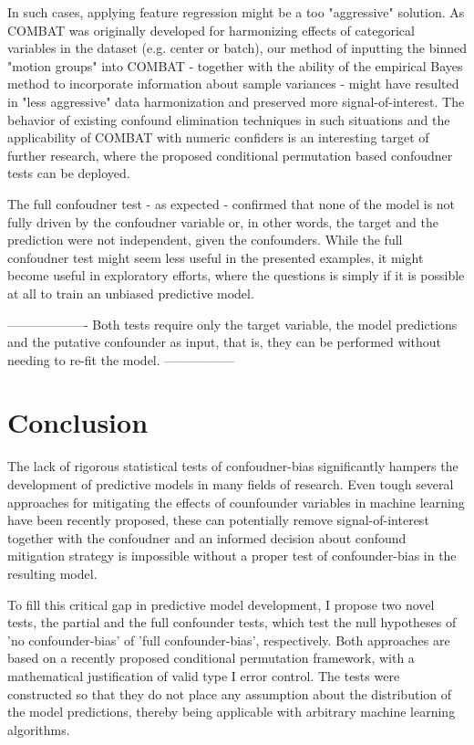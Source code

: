 \documentclass{article}
\begin{document}
In such cases, applying feature regression might be a too "aggressive" solution. As COMBAT was originally developed for harmonizing effects of categorical variables in the dataset (e.g. center or batch), our method of inputting the binned "motion groups" into COMBAT - together with the ability of the empirical Bayes method to incorporate information about sample variances - might have resulted in "less aggressive" data harmonization and preserved more signal-of-interest. 
The behavior of existing confound elimination techniques in such situations and the applicability of COMBAT with numeric confiders is an interesting target of further research, where the proposed conditional permutation based confoudner tests can be deployed.

The full confoudner test - as expected - confirmed that none of the model is not fully driven by the confoudner variable or, in other words, the target and the prediction were not independent, given the confounders. While the full confoudner test might seem less useful in the presented examples, it might become useful in exploratory efforts, where the questions is simply if it is possible at all to train an unbiased predictive model.

-------------------
Both tests require only the target variable, the model predictions and the putative confounder as input, that is, they can be performed without needing to re-fit the model.
-----------------

\section{Conclusion}

The lack of rigorous statistical tests of confoudner-bias significantly hampers the development of predictive models in many fields of research. Even tough several approaches for mitigating the effects of counfounder variables in machine learning have been recently proposed, these can potentially remove signal-of-interest together with the confoudner and an informed decision about confound mitigation strategy is impossible without a proper test of confounder-bias in the resulting model.

To fill this critical gap in predictive model development, I propose two novel tests, the partial and the full confounder tests, which test the null hypotheses of 'no confounder-bias' of 'full confounder-bias', respectively. Both approaches are based on a recently proposed conditional permutation framework, with a mathematical justification of valid type I error control. The tests were constructed so that they do not place any assumption about the distribution of the model predictions, thereby being applicable with arbitrary machine learning algorithms.
\end{document}

